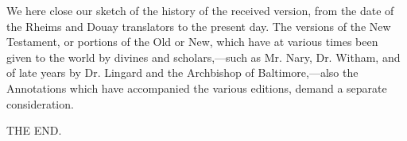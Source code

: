 We here close our sketch of the history of the received version,
from the date of the Rheims and Douay translators to the present day.
The versions of the New Testament, or portions of the Old or New,
which have at various times been given to the world by divines and
scholars,—such as Mr. Nary, Dr. Witham, and of late years by Dr.
Lingard and the Archbishop of Baltimore,—also the Annotations which
have accompanied the various editions, demand a separate
consideration.

THE END.
